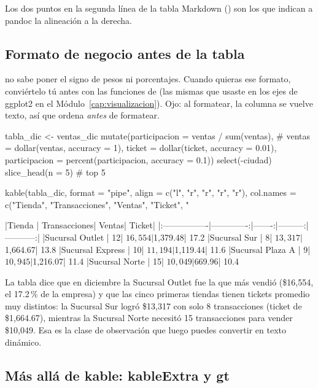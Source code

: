 Los dos puntos en la segunda línea de la tabla Markdown
(\codigo{|-----:|}) son los que indican a pandoc la alineación a la derecha.

\subsection{Formato de negocio antes de la tabla}

 no sabe poner el signo de pesos ni porcentajes. Cuando
quieras ese formato, conviértelo tú antes con las funciones de
 (las mismas que usaste en los ejes de ggplot2 en el
Módulo~\ref{cap:visualizacion}). Ojo: al formatear, la columna se vuelve
texto, así que ordena \emph{antes} de formatear.

\begin{rcode}
tabla_dic <- ventas_dic %
  mutate(participacion = ventas / sum(ventas),       # %
         ventas        = dollar(ventas, accuracy = 1),
         ticket        = dollar(ticket, accuracy = 0.01),
         participacion = percent(participacion, accuracy = 0.1)) %
  select(-ciudad) %
  slice_head(n = 5)                                  # top 5

kable(tabla_dic, format = "pipe", align = c("l", "r", "r", "r", "r"),
      col.names = c("Tienda", "Transacciones", "Ventas", "Ticket",
                    "%
\end{rcode}
\begin{rsalida}


|Tienda           | Transacciones|  Ventas|    Ticket| %
|:----------------|-------------:|-------:|---------:|-----------:|
|Sucursal Outlet  |            12| $16,554| $1,379.48|       17.2%
|Sucursal Sur     |             8| $13,317| $1,664.67|       13.8%
|Sucursal Express |            10| $11,194| $1,119.44|       11.6%
|Sucursal Plaza A |             9| $10,945| $1,216.07|       11.4%
|Sucursal Norte   |            15| $10,049|   $669.96|       10.4%
\end{rsalida}

La tabla dice que en diciembre la Sucursal Outlet fue la que más vendió
(\$16,554, el 17.2\,\% de la empresa) y que las cinco primeras tiendas tienen
tickets promedio muy distintos: la Sucursal Sur logró \$13,317 con solo
8 transacciones (ticket de \$1,664.67), mientras la Sucursal Norte necesitó
15 transacciones para vender \$10,049. Esa es la clase de observación que
luego puedes convertir en texto dinámico.

\subsection{Más allá de kable: kableExtra y gt}

